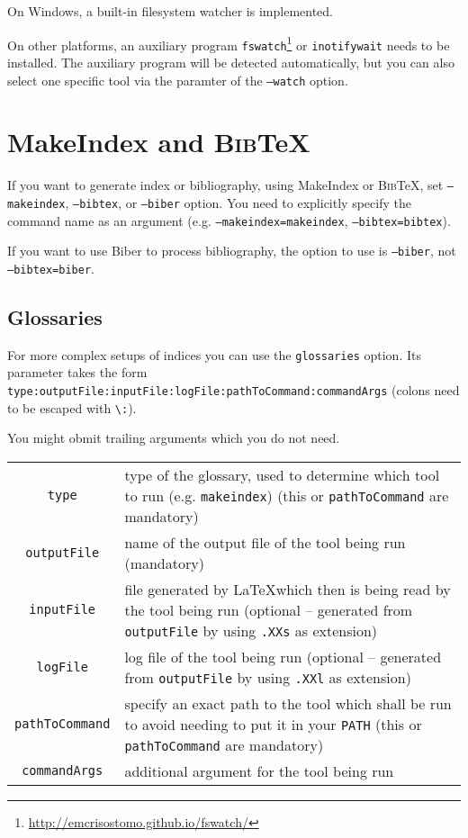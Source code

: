 \documentclass[a4paper]{report}
\providecommand\BibTeX{\textsc{Bib}\TeX}
\begin{document}
On Windows, a built-in filesystem watcher is implemented.

On other platforms, an auxiliary program \texttt{fswatch}\footnote{\url{http://emcrisostomo.github.io/fswatch/}} or \texttt{inotifywait} needs to be installed.
The auxiliary program will be detected automatically, but you can also select one specific tool via the paramter of the \texttt{--watch} option.

\section{MakeIndex and \BibTeX}
If you want to generate index or bibliography, using MakeIndex or \BibTeX, set \texttt{--makeindex}, \texttt{--bibtex}, or \texttt{--biber} option.
You need to explicitly specify the command name as an argument (e.g. \texttt{--makeindex=makeindex}, \texttt{--bibtex=bibtex}).

If you want to use Biber to process bibliography, the option to use is \texttt{--biber}, not \texttt{--bibtex=biber}.

\subsection{Glossaries}
\label{sec:glossaries}
For more complex setups of indices you can use the \texttt{glossaries} option.
Its parameter takes the form
\texttt{type:outputFile:inputFile:logFile:pathToCommand:commandArgs} (colons
need to be escaped with \texttt{\textbackslash{}:}).

You might obmit trailing arguments which you do not need.

\begin{tabularx}{\linewidth}{cX}
	\texttt{type} &
	type of the glossary, used to determine which tool to run (e.g. \texttt{makeindex})
	\newline
	(this or \texttt{pathToCommand} are mandatory)
	\\
	\texttt{outputFile} &
	name of the output file of the tool being run
	\newline
	(mandatory)
	\\
	\texttt{inputFile} &
	file generated by \LaTeX which then is being read by the tool being run
	\newline
	(optional -- generated from \texttt{outputFile} by using \texttt{.XXs} as extension)
	\\
	\texttt{logFile} &
	log file of the tool being run
	(optional -- generated from \texttt{outputFile} by using \texttt{.XXl} as extension)
	\\
	\texttt{pathToCommand} &
	specify an exact path to the tool which shall be run to avoid needing to
	put it in your \texttt{PATH}
	\newline
	(this or \texttt{pathToCommand} are mandatory)
	\\
	\texttt{commandArgs} &
	additional argument for the tool being run
\end{tabularx}
\end{document}
